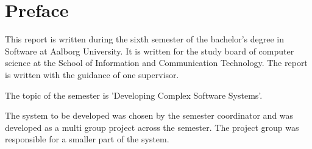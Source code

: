 \chapter*{Preface}
This report is written during the sixth semester of the bachelor's degree in Software at Aalborg University.
It is written for the study board of computer science at the School of Information and Communication Technology.
The report is written with the guidance of one supervisor.

The topic of the semester is 'Developing Complex Software Systems'.

The system to be developed was chosen by the semester coordinator and was developed as a multi group project across the semester. 
The project group was responsible for a smaller part of the system.



\newpage
